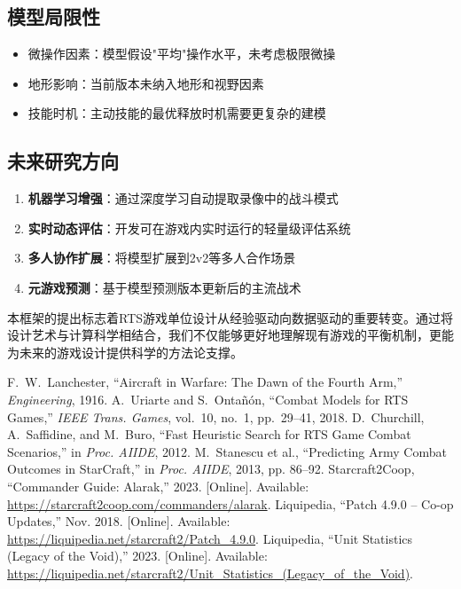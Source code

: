 \documentclass[a4paper,12pt]{article}
\begin{document}
\begin{CJK}{UTF8}{gbsn}
\subsection{模型局限性}
\begin{itemize}
\item 微操作因素：模型假设"平均"操作水平，未考虑极限微操
\item 地形影响：当前版本未纳入地形和视野因素
\item 技能时机：主动技能的最优释放时机需要更复杂的建模
\end{itemize}

\subsection{未来研究方向}
\begin{enumerate}
\item \textbf{机器学习增强}：通过深度学习自动提取录像中的战斗模式
\item \textbf{实时动态评估}：开发可在游戏内实时运行的轻量级评估系统
\item \textbf{多人协作扩展}：将模型扩展到2v2等多人合作场景
\item \textbf{元游戏预测}：基于模型预测版本更新后的主流战术
\end{enumerate}

本框架的提出标志着RTS游戏单位设计从经验驱动向数据驱动的重要转变。通过将设计艺术与计算科学相结合，我们不仅能够更好地理解现有游戏的平衡机制，更能为未来的游戏设计提供科学的方法论支撑。

\begin{thebibliography}{99}\small
{} F.~W.~Lanchester, ``Aircraft in Warfare: The Dawn of the Fourth Arm,'' \emph{Engineering}, 1916.
 A.~Uriarte and S.~Ontañón, ``Combat Models for RTS Games,'' \emph{IEEE Trans. Games}, vol.~10, no.~1, pp.~29–41, 2018.
 D.~Churchill, A.~Saffidine, and M.~Buro, ``Fast Heuristic Search for RTS Game Combat Scenarios,'' in \emph{Proc. AIIDE}, 2012.
 M.~Stanescu et al., ``Predicting Army Combat Outcomes in StarCraft,'' in \emph{Proc. AIIDE}, 2013, pp. 86–92.
 Starcraft2Coop, ``Commander Guide: Alarak,'' 2023. [Online]. Available: \url{https://starcraft2coop.com/commanders/alarak}.
 Liquipedia, ``Patch 4.9.0 – Co-op Updates,'' Nov. 2018. [Online]. Available: \url{https://liquipedia.net/starcraft2/Patch_4.9.0}.
 Liquipedia, ``Unit Statistics (Legacy of the Void),'' 2023. [Online]. Available: \url{https://liquipedia.net/starcraft2/Unit_Statistics_(Legacy_of_the_Void)}.
\end{thebibliography}


\end{CJK}
\end{document}
